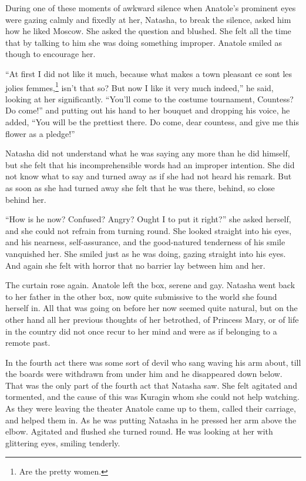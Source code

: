 During one of these moments of awkward silence when Anatole's
prominent eyes were gazing calmly and fixedly at her, Natasha, to
break the silence, asked him how he liked Moscow. She asked the
question and blushed. She felt all the time that by talking to
him she was doing something improper. Anatole smiled as though to
encourage her.

``At first I did not like it much, because what makes a town
pleasant ce sont les jolies femmes,\footnote{Are the pretty
women.} isn't that so? But now I like it very much indeed,'' he
said, looking at her significantly. ``You'll come to the costume
tournament, Countess? Do come!'' and putting out his hand to her
bouquet and dropping his voice, he added, ``You will be the
prettiest there. Do come, dear countess, and give me this flower
as a pledge!''

Natasha did not understand what he was saying any more than he
did himself, but she felt that his incomprehensible words had an
improper intention. She did not know what to say and turned away
as if she had not heard his remark. But as soon as she had turned
away she felt that he was there, behind, so close behind her.

``How is he now? Confused? Angry? Ought I to put it right?'' she
asked herself, and she could not refrain from turning round. She
looked straight into his eyes, and his nearness, self-assurance,
and the good-natured tenderness of his smile vanquished her. She
smiled just as he was doing, gazing straight into his eyes. And
again she felt with horror that no barrier lay between him and
her.

The curtain rose again. Anatole left the box, serene and
gay. Natasha went back to her father in the other box, now quite
submissive to the world she found herself in. All that was going
on before her now seemed quite natural, but on the other hand all
her previous thoughts of her betrothed, of Princess Mary, or of
life in the country did not once recur to her mind and were as if
belonging to a remote past.

In the fourth act there was some sort of devil who sang waving
his arm about, till the boards were withdrawn from under him and
he disappeared down below. That was the only part of the fourth
act that Natasha saw.  She felt agitated and tormented, and the
cause of this was Kuragin whom she could not help watching. As
they were leaving the theater Anatole came up to them, called
their carriage, and helped them in. As he was putting Natasha in
he pressed her arm above the elbow. Agitated and flushed she
turned round. He was looking at her with glittering eyes, smiling
tenderly.


